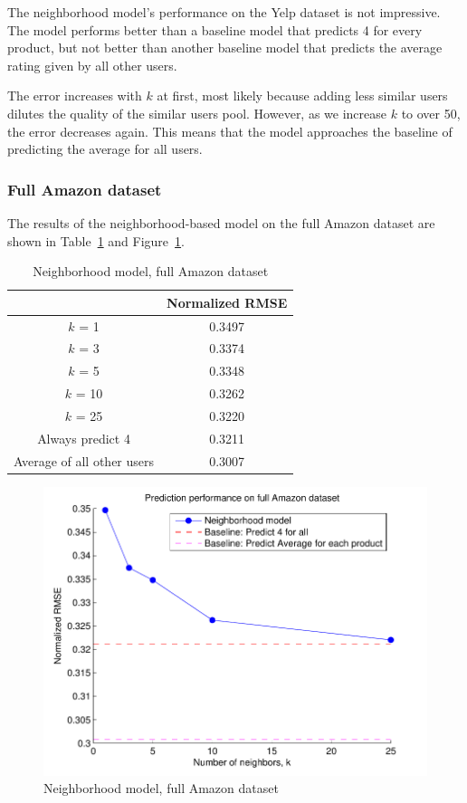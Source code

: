 \documentclass[letterpaper, 11 pt, conference]{ieeeconf}
\begin{document}
The neighborhood model's performance on the Yelp dataset is not impressive. The 
model performs better than a baseline model that predicts 4 for every product, 
but not better than another baseline model that predicts the average rating 
given by all other users. 

The error increases with $k$ at first, most likely because adding less similar 
users dilutes the quality of the similar users pool. However, as we increase 
$k$ to over 50, the error decreases again. This means that the model approaches 
the baseline of predicting the average for all users. 

\subsubsection{Full Amazon dataset}
The results of the neighborhood-based model on the full Amazon dataset 
are shown in Table~\ref{table:modelone_full} and Figure~\ref{fig:modelone_full}.

\begin{table}[htb]
\centering
\begin{tabular}{|c|c|}
\cline{2-2}

\multicolumn{1}{c|}{}  & {Normalized RMSE} \tabularnewline \hline
$k$ = 1 & 0.3497  \tabularnewline
$k$ = 3 &  0.3374 \tabularnewline
$k$ = 5 & 0.3348  \tabularnewline
$k$ = 10 & 0.3262  \tabularnewline
$k$ = 25  & 0.3220  \tabularnewline
\hline
Always predict 4 & 0.3211 \tabularnewline 
Average of all other users & 0.3007 \tabularnewline

\hline
\end{tabular}
\caption{Neighborhood model, full Amazon dataset}
\label{table:modelone_full}
\end{table}

\begin{figure}[h]
\includegraphics[scale=0.6]{images/modelone_full.pdf}
\caption{Neighborhood model, full Amazon dataset}
\label{fig:modelone_full}
\end{figure}
\end{document}
